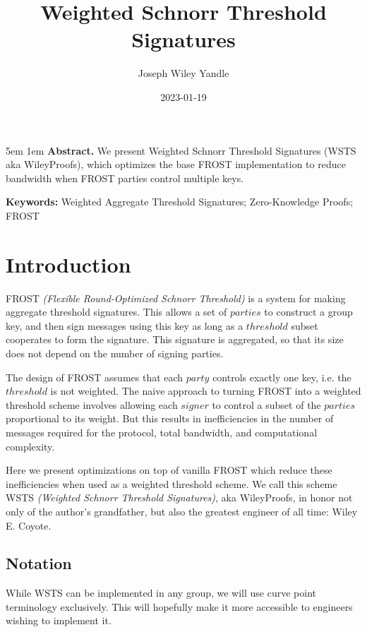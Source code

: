 \documentclass{article}
\title{Weighted Schnorr Threshold Signatures}
\date{2023-01-19}
\author{Joseph Wiley Yandle}
\theoremstyle{definition}
\theoremstyle{remark}
\begin{document}
\onecolumn
\maketitle

\begingroup
\leftskip5em
\parskip1em
\rightskip\leftskip
\noindent\textbf{Abstract.} We present Weighted Schnorr Threshold Signatures (WSTS aka WileyProofs), which optimizes the base FROST implementation to reduce bandwidth when FROST parties control multiple keys.

\par
\noindent\textbf{Keywords:} Weighted Aggregate Threshold Signatures; Zero-Knowledge Proofs; FROST
\par
\endgroup

\section{
  Introduction
}

FROST \emph{(Flexible Round-Optimized Schnorr Threshold)} \cite{frost} is a system for making aggregate threshold signatures.  This allows a set of $parties$ to construct a group key, and then sign messages using this key as long as a $threshold$ subset cooperates to form the signature.  This signature is aggregated, so that its size does not depend on the number of signing parties.

The design of FROST assumes that each $party$ controls exactly one key, i.e. the $threshold$ is not weighted.  The naive approach to turning FROST into a weighted threshold scheme involves allowing each $signer$ to control a subset of the $parties$ proportional to its weight.  But this results in inefficiencies in the number of messages required for the protocol, total bandwidth, and computational complexity.

Here we present optimizations on top of vanilla FROST which reduce these inefficiencies when used as a weighted threshold scheme.  We call this scheme WSTS \emph{(Weighted Schnorr Threshold Signatures)}, aka WileyProofs, in honor not only of the author's grandfather, but also the greatest engineer of all time: Wiley E. Coyote.

\subsection{
  Notation
}

While WSTS can be implemented in any group, we will use curve point terminology exclusively.  This will hopefully make it more accessible to engineers wishing to implement it.
\end{document}
